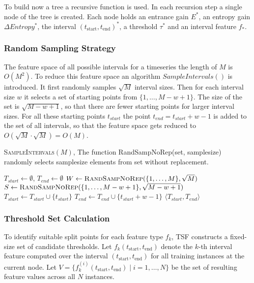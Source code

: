 To build now a tree a recursive function is used. In each recursion step a single node of the 
tree is created. Each node holds an entrance gain $E^*$, an entropy gain $\Delta Entropy^*$, the 
interval $(t_{\mathrm{start}}, t_{\mathrm{end}})^*$, a threshold $\tau^*$ and an interval feature $f_*$.

\subsubsection*{Random Sampling Strategy}
The feature space of all possible intervals for a timeseries the length of $M$
is $O(M^2)$. To reduce this feature space an algorithm $SampleIntervals()$ is introduced. %
It first randomly samples $\sqrt{M}$ interval sizes. Then for each interval size $w$ it selects
a set of starting points from $\{1, \dots, M-w+1\}$. The size of the set is $\sqrt{M - w + 1}$, so that 
there are fewer starting points for larger interval sizes. For all these starting points $t_{start}$ the point 
$t_{end} = t_{start} + w - 1 $ is added to the set of all intervals, so that the feature space gets reduced to 
$O(\sqrt{M} \cdot \sqrt{M}) = O(M)$.

\begin{algorithm}[H]
\caption{\textsc{SampleIntervals}$(M)$, The function RandSampNoRep(set, samplesize)
randomly selects samplesize elements from set without replacement.}
\begin{algorithmic}[1]
\State $T_{start} \gets \emptyset$, $T_{end} \gets \emptyset$
\State $W \gets \textsc{RandSampNoRep}(\{1, \dots, M\}, \sqrt{M})$
    \State $S \gets \textsc{RandSampNoRep}(\{1, \dots, M - w + 1\}, \sqrt{M - w + 1})$
        \State $T_{start} \gets T_{start} \cup \{t_{start}\}$
        \State $T_{end}  \gets T_{end}  \cup \{t_{start}  + w - 1\}$
    \EndFor
\EndFor
\State \Return $\langle T_{start}, T_{end} \rangle$
\end{algorithmic}
\end{algorithm}

\subsubsection*{Threshold Set Calculation}

To identify suitable split points for each feature type $f_k$, 
TSF constructs a fixed-size set of candidate thresholds. 
Let $f_k (t_{\mathrm{start}}, t_{\mathrm{end}})$ denote the $k$-th interval feature 
computed over 
the interval $(t_{\mathrm{start}}, t_{\mathrm{end}})$ for all training instances at 
the current node. Let $V = \{ f_k^{(i)} (t_{\mathrm{start}}, t_{\mathrm{end}}) \mid i = 1, \dots, N \}$ 
be the set of resulting feature values across all $N$ 
instances.

